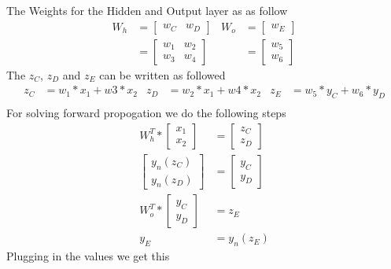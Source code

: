 \documentclass[12pt,english]{article}
\begin{document}
The Weights for the Hidden and Output layer as as follow
\begin{align*} 
W_h &= \begin{bmatrix} w_C & w_D \end{bmatrix} &
W_o &= \begin{bmatrix} w_E  \end{bmatrix} \\
&= \begin{bmatrix} w_1 & w_2 \\ w_3 & w_4 \end{bmatrix} &
&= \begin{bmatrix} w_5 \\ w_6 \end{bmatrix}
\end{align*}
The $z_C$, $z_D$ and $z_E$ can be written as followed
\begin{align*} 
z_C &= w_1 * x_1 +w3 * x_2 &
z_D &= w_2 * x_1 +w4 * x_2 &
z_E &= w_5 * y_C + w_6 * y_D \\
\end{align*}
For  solving forward propogation we do the following steps
\begin{align}
W^T_h * \begin{bmatrix} x_1 \\ x_2 \end{bmatrix}  &= \begin{bmatrix} z_C \\ z_D \end{bmatrix} \\
\begin{bmatrix} y_n(z_C) \\ y_n(z_D) \end{bmatrix} &= \begin{bmatrix} y_C \\ y_D \end{bmatrix} \\
W^T_o * \begin{bmatrix} y_C \\ y_D \end{bmatrix} &=z_E\\
y_E &= y_n(z_E)
\end{align}
Plugging in the values we get this
\end{document}
